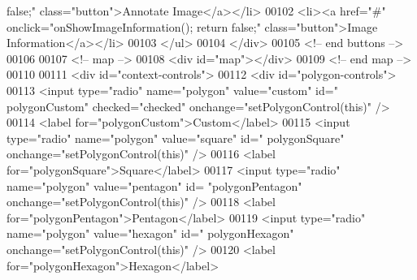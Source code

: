\begin{DoxyCode}
{       false;"} \textcolor{keyword}{class}=\textcolor{stringliteral}{"button"}>Annotate Image</a></li>
00102                         <li><a href=\textcolor{stringliteral}{"#"} onclick=\textcolor{stringliteral}{"onShowImageInformation();
       return false;"} \textcolor{keyword}{class}=\textcolor{stringliteral}{"button"}>Image Information</a></li>
00103                     </ul>
00104                 </div>
00105                 <!-- end buttons -->
00106 
00107                 <!-- map -->
00108                 <div \textcolor{keywordtype}{id}=\textcolor{stringliteral}{"map"}></div>
00109                 <!-- end map -->
00110 
00111                 <div \textcolor{keywordtype}{id}=\textcolor{stringliteral}{"context-controls"}>
00112                     <div \textcolor{keywordtype}{id}=\textcolor{stringliteral}{"polygon-controls"}>
00113                         <input type=\textcolor{stringliteral}{"radio"} name=\textcolor{stringliteral}{"polygon"} value=\textcolor{stringliteral}{"custom"} \textcolor{keywordtype}{id}=\textcolor{stringliteral}{"
      polygonCustom"} checked=\textcolor{stringliteral}{"checked"} onchange=\textcolor{stringliteral}{"setPolygonControl(this)"} />
00114                         <label \textcolor{keywordflow}{for}=\textcolor{stringliteral}{"polygonCustom"}>Custom</label>
00115                         <input type=\textcolor{stringliteral}{"radio"} name=\textcolor{stringliteral}{"polygon"} value=\textcolor{stringliteral}{"square"} \textcolor{keywordtype}{id}=\textcolor{stringliteral}{"
      polygonSquare"} onchange=\textcolor{stringliteral}{"setPolygonControl(this)"} />
00116                         <label \textcolor{keywordflow}{for}=\textcolor{stringliteral}{"polygonSquare"}>Square</label>
00117                         <input type=\textcolor{stringliteral}{"radio"} name=\textcolor{stringliteral}{"polygon"} value=\textcolor{stringliteral}{"pentagon"} \textcolor{keywordtype}{id}=\textcolor{stringliteral}{
      "polygonPentagon"} onchange=\textcolor{stringliteral}{"setPolygonControl(this)"} />
00118                         <label \textcolor{keywordflow}{for}=\textcolor{stringliteral}{"polygonPentagon"}>Pentagon</label>
00119                         <input type=\textcolor{stringliteral}{"radio"} name=\textcolor{stringliteral}{"polygon"} value=\textcolor{stringliteral}{"hexagon"} \textcolor{keywordtype}{id}=\textcolor{stringliteral}{"
      polygonHexagon"} onchange=\textcolor{stringliteral}{"setPolygonControl(this)"} />
00120                         <label \textcolor{keywordflow}{for}=\textcolor{stringliteral}{"polygonHexagon"}>Hexagon</label>

\end{DoxyCode}
